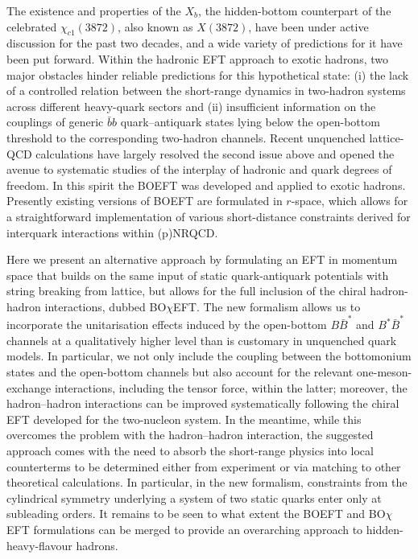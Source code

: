 \documentclass[aps,prd,showpacs,amsmath,twocolumn,superscriptaddress,floatfix,nofootinbib,notitlepage]{revtex4-2}
\newcommand{\X}{X(3872)}
\newcommand{\Xb}{X_b}
\newcommand{\BOchiEFT}{BO$\chi$EFT\xspace}
\begin{document}
The existence and properties of the $\Xb$, the hidden-bottom counterpart of the celebrated
$\chi_{c1}(3872)$, also known as $ \X$, have been under active discussion for the past two decades, and a wide variety of predictions for it have been put forward. Within the hadronic EFT approach to exotic hadrons, two major obstacles hinder reliable predictions for this hypothetical state: (i) the lack of a controlled relation between the short-range dynamics in two-hadron systems across different heavy-quark sectors and (ii) insufficient information on the couplings of generic $\bar{b}b$ quark--antiquark states lying below the open-bottom threshold to the corresponding two-hadron channels. Recent unquenched lattice-QCD calculations have largely resolved the second issue above
and opened the avenue to systematic studies of the interplay of hadronic and quark degrees of freedom. In this spirit the BOEFT was developed and applied to exotic hadrons.
Presently existing versions of BOEFT are formulated in $r$-space, which allows for a straightforward implementation
of various short-distance constraints derived for interquark interactions 
within (p)NRQCD. 

Here we present an alternative approach by formulating an EFT in momentum space that builds on the same input of static quark-antiquark potentials with string breaking from lattice, but allows for the full inclusion of the chiral hadron-hadron interactions, dubbed \BOchiEFT. The new formalism allows us
to incorporate the unitarisation effects induced by the open-bottom $B\bar{B}^*$
and $B^*\bar{B}^*$
channels at a qualitatively higher level than is customary in unquenched quark models. In particular, we not only include the coupling between the bottomonium states and the open-bottom channels but also account for the relevant one-meson-exchange interactions, including the tensor force, within the latter; moreover, the hadron--hadron interactions can be improved systematically following the chiral EFT developed for the two-nucleon system. In the meantime, while this overcomes the problem with the hadron--hadron interaction, the suggested approach comes with the need to absorb the short-range physics into local counterterms to be determined either from experiment or via matching to other theoretical calculations.
In particular, in the new formalism, constraints from the cylindrical symmetry underlying a system of two static quarks enter only at subleading orders. It remains to be seen to what extent the BOEFT and \BOchiEFT formulations can be merged to provide an overarching approach to hidden-heavy-flavour hadrons.
\end{document}
